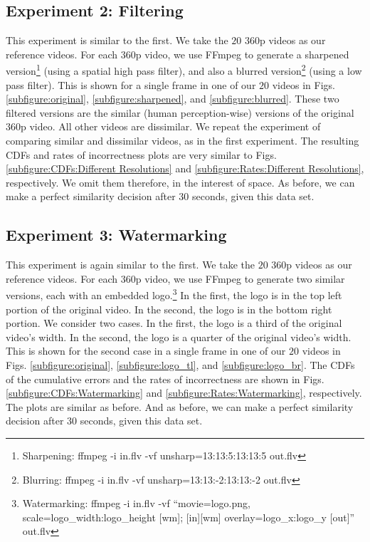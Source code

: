 \documentclass{article}
\begin{document}
\subsection{Experiment 2: Filtering}
This experiment is similar to the first. We take the $20$ $360$p videos as our reference videos. For each $360$p video, we use FFmpeg to generate a sharpened version\footnote{Sharpening: ffmpeg -i in.flv -vf unsharp=13:13:5:13:13:5 out.flv} (using a spatial high pass filter), and also a blurred version\footnote{Blurring: ffmpeg -i in.flv -vf unsharp=13:13:-2:13:13:-2 out.flv} (using a low pass filter). This is shown for a single frame in one of our $20$ videos in Figs. \ref{subfigure:original}, \ref{subfigure:sharpened}, and \ref{subfigure:blurred}. These two filtered versions are the similar (human perception-wise) versions of the original $360$p video. All other videos are dissimilar. We repeat the experiment of comparing similar and dissimilar videos, as in the first experiment. The resulting CDFs and rates of incorrectness plots are very similar to Figs. \ref{subfigure:CDFs:Different Resolutions} and \ref{subfigure:Rates:Different Resolutions}, respectively. We omit them therefore, in the interest of space. As before, we can make a perfect similarity decision after $30$ seconds, given this data set.

\subsection{Experiment 3: Watermarking}
This experiment is again similar to the first. We take the $20$ $360$p videos as our reference videos. For each $360$p video, we use FFmpeg to generate two similar versions, each with an embedded logo.\footnote{Watermarking: ffmpeg -i in.flv -vf ``movie=logo.png, scale=logo\_width:logo\_height [wm]; [in][wm] overlay=logo\_x:logo\_y [out]'' out.flv} In the first, the logo is in the top left portion of the original video. In the second, the logo is in the bottom right portion. We consider two cases. In the first, the logo is a third of the original video's width. In the second, the logo is a quarter of the original video's width. This is shown for the second case in a single frame in one of our $20$ videos in Figs. \ref{subfigure:original}, \ref{subfigure:logo_tl}, and \ref{subfigure:logo_br}. The CDFs of the cumulative errors and the rates of incorrectness are shown in Figs. \ref{subfigure:CDFs:Watermarking} and \ref{subfigure:Rates:Watermarking}, respectively. The plots are similar as before. And as before, we can make a perfect similarity decision after $30$ seconds, given this data set.
\end{document}
